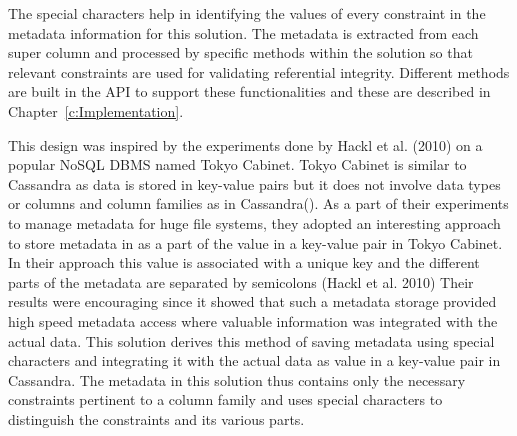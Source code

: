 The special characters help in identifying the values of every constraint in the
metadata information for this solution.  The metadata is extracted from each
super column and processed by specific methods within the solution so that
relevant constraints are used for validating referential integrity.  Different
methods are built in the \ac{API} to support these functionalities and
these are described in Chapter~\ref{c:Implementation}. 


This design was inspired by the experiments done by Hackl et al.   (2010) on a
popular \ac{NoSQL} \ac{DBMS} named Tokyo Cabinet.  Tokyo Cabinet is similar to
Cassandra as data is stored in key-value pairs but it does not involve data
types or columns and column families as in Cassandra(). 
As a part of their experiments to manage metadata for huge file systems,  they
adopted an interesting approach to store metadata in as a part of the value in a
key-value pair in Tokyo Cabinet.  In their approach this value  is associated
with a unique key and the different parts of the metadata are separated by
semicolons (Hackl et al.   2010)
Their results were encouraging since it showed that such a metadata
storage provided high speed metadata access where valuable information was 
integrated with the actual data.  This solution derives this method of saving
metadata using special characters and integrating it with the actual data as
value in a key-value pair in Cassandra.  The metadata in this solution thus
contains only the necessary constraints pertinent to a column family and uses
special characters to distinguish the constraints and its various parts. 













